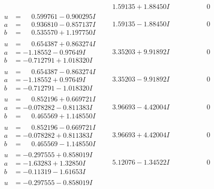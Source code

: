 \documentclass[1p]{elsarticle_modified}
\theoremstyle{definition}
\begin{document}
$$\begin{array}{c|c|c}
 & \phantom{-}1.59135 + 1.88450 I & \phantom{-0.000000 } 0 \\ \hline\begin{aligned}
u &= \phantom{-}0.599761 - 0.900295 I \\
a &= \phantom{-}0.936810 - 0.857137 I \\
b &= \phantom{-}0.535570 + 1.197750 I\end{aligned}
 & \phantom{-}1.59135 - 1.88450 I & \phantom{-0.000000 } 0 \\ \hline\begin{aligned}
u &= \phantom{-}0.654387 + 0.863274 I \\
a &= -1.18552 - 0.97649 I \\
b &= -0.712791 + 1.018320 I\end{aligned}
 & \phantom{-}3.35203 + 9.91892 I & \phantom{-0.000000 } 0 \\ \hline\begin{aligned}
u &= \phantom{-}0.654387 - 0.863274 I \\
a &= -1.18552 + 0.97649 I \\
b &= -0.712791 - 1.018320 I\end{aligned}
 & \phantom{-}3.35203 - 9.91892 I & \phantom{-0.000000 } 0 \\ \hline\begin{aligned}
u &= \phantom{-}0.852196 + 0.669721 I \\
a &= -0.078282 - 0.811383 I \\
b &= \phantom{-}0.465569 + 1.148550 I\end{aligned}
 & \phantom{-}3.96693 - 4.42004 I & \phantom{-0.000000 } 0 \\ \hline\begin{aligned}
u &= \phantom{-}0.852196 - 0.669721 I \\
a &= -0.078282 + 0.811383 I \\
b &= \phantom{-}0.465569 - 1.148550 I\end{aligned}
 & \phantom{-}3.96693 + 4.42004 I & \phantom{-0.000000 } 0 \\ \hline\begin{aligned}
u &= -0.297555 + 0.858019 I \\
a &= -1.63283 + 1.32850 I \\
b &= -0.11319 - 1.61653 I\end{aligned}
 & \phantom{-}5.12076 - 1.34522 I & \phantom{-0.000000 } 0 \\ \hline\begin{aligned}
u &= -0.297555 - 0.858019 I \\

\end{aligned}
\end{array}$$
\end{document}
